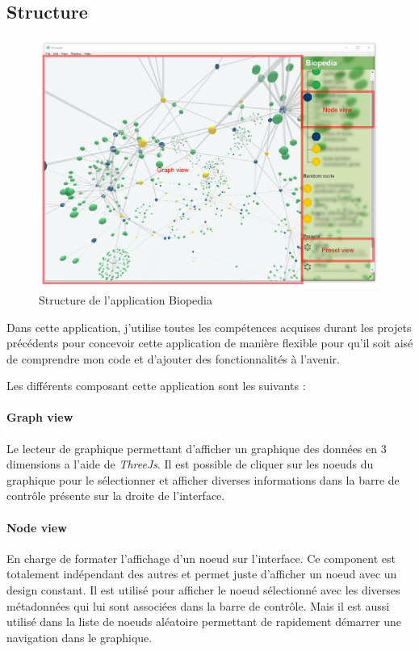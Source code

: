 \subsection{Structure}
\label{biomerieuxBiopediaStructure}

\begin{figure}[h]
    \centering
    \includegraphics[scale=0.8]{img/biopedia-structure.pdf}
    \caption{Structure de l'application Biopedia}
\end{figure}

Dans cette application, j'utilise toutes les compétences acquises durant les projets précédents pour concevoir cette application de manière flexible pour qu'il soit aisé de comprendre mon code et d'ajouter des fonctionnalités à l'avenir.

\clearpage

Les différents \components composant cette application sont les suivants :

\paragraph{Graph view} Le lecteur de graphique permettant d'afficher un graphique des données en 3 dimensions a l'aide de \emph{ThreeJs}.
Il est possible de cliquer sur les noeuds du graphique pour le sélectionner et afficher diverses informations dans la barre de contrôle présente sur la droite de l'interface.

\paragraph{Node view} En charge de formater l'affichage d'un noeud sur l'interface.
Ce component est totalement indépendant des autres et permet juste d'afficher un noeud avec un design constant.
Il est utilisé pour afficher le noeud sélectionné avec les diverses métadonnées qui lui sont associées dans la barre de contrôle.
Mais il est aussi utilisé dans la liste de noeuds aléatoire permettant de rapidement démarrer une navigation dans le graphique.

